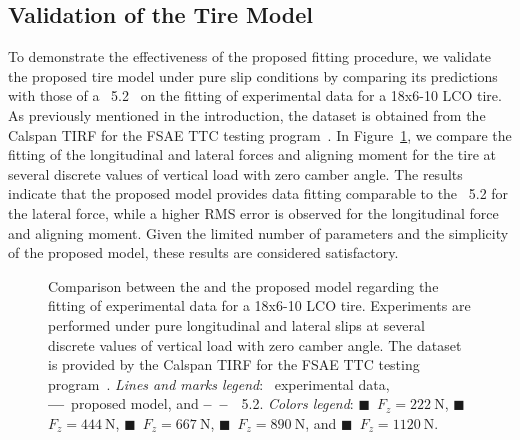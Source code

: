 \subsection{Validation of the Tire Model}

To demonstrate the effectiveness of the proposed fitting procedure, we validate the proposed tire model under pure slip conditions by comparing its predictions with those of a \MagicFormulae{}~5.2~\cite{pacejka2012tire} on the fitting of experimental data for a \Hoosier{} 18x6-10 LCO tire. As previously mentioned in the introduction, the dataset is obtained from the Calspan \ac{TIRF} for the \ac{FSAE} \ac{TTC} testing program~\cite{kasprzak2006formula}. In Figure~\ref{app3:fig:fsae_pure}, we compare the fitting of the longitudinal and lateral forces and aligning moment for the \Hoosier{} tire at several discrete values of vertical load with zero camber angle. The results indicate that the proposed model provides data fitting comparable to the \MagicFormulae{}~5.2 for the lateral force, while a higher \ac{RMS} error is observed for the longitudinal force and aligning moment. Given the limited number of parameters and the simplicity of the proposed model, these results are considered satisfactory.

\begin{figure}[htb]
  \centering
  \caption{Comparison between the \MagicFormulae{} and the proposed model regarding the fitting of experimental data for a \Hoosier{} 18x6-10 LCO tire. Experiments are performed under pure longitudinal and lateral slips at several discrete values of vertical load with zero camber angle. The dataset is provided by the Calspan \ac{TIRF} for the \ac{FSAE} \ac{TTC} testing program~\cite{kasprzak2006formula}. \emph{Lines and marks legend}: \textbullet~experimental data, \textbf{---}~proposed model, and \textbf{--~--}~\MagicFormulae{}~5.2. \emph{Colors legend}: \textcolor{mycolor1}{$\blacksquare$}~$F_z = \SI{222}{\newton}$, \textcolor{mycolor2}{$\blacksquare$}~$F_z = \SI{444}{\newton}$, \textcolor{mycolor3}{$\blacksquare$}~$F_z = \SI{667}{\newton}$, \textcolor{mycolor4}{$\blacksquare$}~$F_z = \SI{890}{\newton}$, and \textcolor{mycolor5}{$\blacksquare$}~$F_z = \SI{1120}{\newton}$.}
  \label{app3:fig:fsae_pure}
\end{figure}


